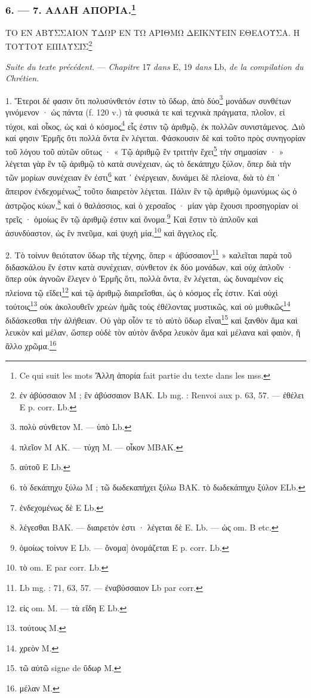 \documentclass[a4paper, 11pt, oneside, polutonikogreek, french]{article}
\begin{document}
\bigskip
\centerline{\EightStarTaper}
\centerline{\EightStarTaper\EightStarTaper}
\bigskip

\subsubsection[6. --- 7. ΑΛΛΗ ΑΠΟΡΙΑ.]{6. --- 7. ΑΛΛΗ ΑΠΟΡΙΑ.\footnote{Ce qui suit les mots Ἄλλη ἀπορία fait partie du texte dans les mss.}}

ΤΟ ΕΝ ΑΒΥΣΣΑΙΟΝ ΥΔΩΡ ΕΝ ΤΩ ΑΡΙΘΜΩ ΔΕΙΚΝΥΕΙΝ ΕΘΕΛΟΥΣΑ. Η ΤΟΥΤΟΥ ΕΠΙΛΥΣΙΣ\footnote{ἐν ἀβύσσαιον M ; ἓν ἀβύσσαιον BAK. Lb mg. : Renvoi aux p. 63, 57. --- ἐθέλει E p. corr. Lb.}

\emph{Suite du texte précédent.} --- \emph{Chapitre} 17 \emph{dans} E, 19 \emph{dans} Lb, \emph{de la compilation du Chrétien.}

\bigskip

1. Ἕτεροι δέ φασιν ὅτι πολυσύνθετόν ἐστιν τὸ ὕδωρ, ἀπὸ δύο\footnote{πολὺ σύνθετον M. --- ὑπὸ Lb.} μονάδων συνθέτων γινόμενον · ὡς πάντα (f. 120 v.) τὰ φυσικά τε καὶ τεχνικὰ πράγματα, πλοῖον, εἰ τύχοι, καὶ οἶκος, ὡς καὶ ὁ κόσμος\footnote{πλεῖον M AK. --- τύχη M. --- οἶκον MBAK.} εἷς ἐστιν τῷ ἀριθμῷ, ἐκ πολλῶν συνιστάμενος. Διὸ καί φησιν Ἑρμῆς ὅτι πολλὰ ὄντα ἓν λέγεται. Φάσκουσιν δὲ καὶ τοῦτο πρὸς συνηγορίαν τοῦ λόγου τοῦ αὐτῶν οὕτως · « Τῷ ἀριθμῷ ἓν τριττὴν ἔχει\footnote{αὐτοῦ E Lb.} τὴν σημασίαν · » λέγεται γὰρ ἓν τῷ ἀριθμῷ τὸ κατὰ συνέχειαν, ὡς τὸ δεκάπηχυ ξύλον, ὅπερ διὰ τὴν τῶν μορίων συνέχειαν ἕν ἐστι\footnote{τὸ δεκάπηχυ ξύλω M ; τῶ δωδεκαπήχει ξύλω BAK. τὸ δωδεκάπηχυ ξύλον ELb.} κατ ᾽ ἐνέργειαν, δυνάμει δὲ πλείονα, διὰ τὸ ἐπ ᾽ ἄπειρον ἐνδεχομένως\footnote{ἐνδεχομένως δὲ E Lb.} τοῦτο διαιρετὸν λέγεται. Πάλιν ἓν τῷ ἀριθμῷ ὁμωνύμως ὡς ὁ ἀστρῷος κύων,\footnote{λέγεσθαι BAK. --- διαιρετόν ἐστι · λέγεται δὲ E. Lb. --- ὡς om. B etc.} καὶ ὁ θαλάσσιος, καὶ ὁ χερσαῖος · μίαν γὰρ ἔχουσι προσηγορίαν οἱ τρεῖς · ὁμοίως ἓν τῷ ἀριθμῷ ἐστιν καὶ ὄνομα.\footnote{ὁμοίως τοίνυν E Lb. --- ὄνομα] ὀνομάζεται E p. corr. Lb.} Καὶ ἔστιν τὸ ἁπλοῦν καὶ ἀσυνδύαστον, ὡς ἓν πνεῦμα, καὶ ψυχὴ μία,\footnote{τὸ om. E par corr. Lb.} καὶ ἄγγελος εἷς.

2. Τὸ τοίνυν θειότατον ὕδωρ τῆς τέχνης, ὅπερ « ἀβύσσαιον\footnote{Lb mg. : 71, 63, 57. --- ἐναβύσσαιον Lb par corr.} » καλεῖται παρὰ τοῦ διδασκάλου ἕν ἐστιν κατὰ συνέχειαν, σύνθετον ἐκ δύο μονάδων, καὶ οὐχ ἁπλοῦν · ὅπερ οὐκ ἀγνοῶν ἔλεγεν ὁ Ἑρμῆς ὅτι, πολλὰ ὄντα, ἓν λέγεται, ὡς δυναμένον εἰς πλείονα τῷ εἴδει\footnote{εἰς om. M. --- τὰ εἴδη E Lb.} καὶ τῷ ἀριθμῷ διαιρεῖσθαι, ὡς ὁ κόσμος εἷς ἐστιν. Καὶ οὐχὶ τούτοις\footnote{τούτους M.} οὐκ ἀκολουθεῖν χρεὼν ἡμᾶς τοὺς ἐθέλοντας μυστικῶς, καὶ οὐ μυθικῶς\footnote{χρεὸν M.} διδάσκεσθαι τὴν ἀλήθειαν. Οὐ γὰρ οἷόν τε τὸ αὐτὸ ὕδωρ εἶναι\footnote{τῶ αὐτῶ signe de ὕδωρ M.} καὶ ξανθὸν ἅμα καὶ λευκὸν καὶ μέλαν, ὥσπερ οὐδὲ τὸν αὐτὸν ἄνδρα λευκὸν ἅμα καὶ μέλανα καὶ φαιὸν, ἢ ἄλλο χρῶμα.\footnote{μέλαν M.}
\end{document}
